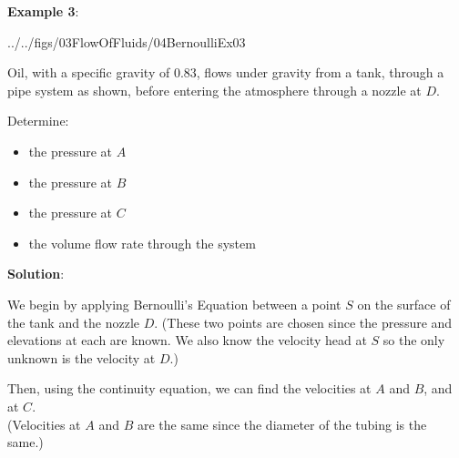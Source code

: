 \documentclass[10pt]{amsart}
\begin{document}
\begin{minipage}[t]{0.45\textwidth}
	\raggedright
	\textbf{Example 3}:\\
	\vspace*{-0.5cm}
	\begin{cfig}[0.5]{../../figs/03FlowOfFluids/04BernoulliEx03}\end{cfig}
	Oil, with a specific gravity of $0.83$, flows under gravity from a tank, through a pipe system as shown, before
	entering the atmosphere through a nozzle at $D$. \par
	Determine:
	\begin{itemize}
		\item the pressure at $A$
		\item the pressure at $B$
		\item the pressure at $C$
		\item the volume flow rate through the system
	\end{itemize}
	\parb
	\textbf{Solution}:
	\parb
	\raggedright
	We begin by applying Bernoulli's Equation between a point $S$ on the surface of the tank and the nozzle $D$.
	(These two points are chosen since the pressure and elevations at each are known. We also know the velocity head at $S$ so the only unknown is the velocity at $D$.)
	\parm
	
	Then, using the continuity equation, we can find the velocities at $A$ and $B$, and at $C$. \\(Velocities at $A$ and $B$ are the same since the diameter of the tubing is the same.)
\end{minipage}
\hfill
\end{document}
